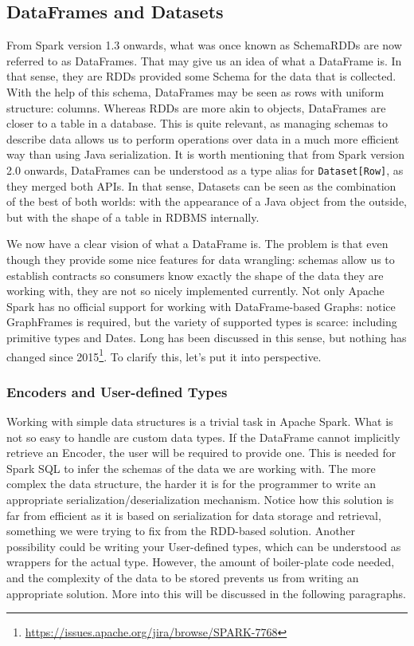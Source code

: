 \subsection{DataFrames and Datasets}

From Spark version 1.3 onwards, what was once known as SchemaRDDs are now referred to as DataFrames. That may give us an idea of what a DataFrame is. In that sense, they are RDDs provided some Schema for the data that is collected. With the help of this schema, DataFrames may be seen as rows with uniform structure: columns. Whereas RDDs are more akin to objects, DataFrames are closer to a table in a database. This is quite relevant, as managing schemas to describe data allows us to perform operations over data in a much more efficient way than using Java serialization. It is worth mentioning that from Spark version 2.0 onwards, DataFrames can be understood as a type alias for \texttt{Dataset[Row]}, as they merged both APIs. In that sense, Datasets can be seen as the combination of the best of both worlds: with the appearance of a Java object from the outside, but with the shape of a table in RDBMS internally.

We now have a clear vision of what a DataFrame is. The problem is that even though they provide some nice features for data wrangling: schemas allow us to establish contracts so consumers know exactly the shape of the data they are working with, they are not so nicely implemented currently. Not only Apache Spark has no official support for working with DataFrame-based Graphs: notice GraphFrames is required, but the variety of supported types is scarce: including primitive types and Dates. Long has been discussed in this sense, but nothing has changed since 2015\footnote{\url{https://issues.apache.org/jira/browse/SPARK-7768}}. To clarify this, let's put it into perspective.

\label{sec:encoders}
\subsubsection{Encoders and User-defined Types}

Working with simple data structures is a trivial task in Apache Spark. What is not so easy to handle are custom data types. If the DataFrame cannot implicitly retrieve an Encoder, the user will be required to provide one. This is needed for Spark SQL to infer the schemas of the data we are working with. The more complex the data structure, the harder it is for the programmer to write an appropriate serialization/deserialization mechanism. Notice how this solution is far from efficient as it is based on serialization for data storage and retrieval, something we were trying to fix from the RDD-based solution. Another possibility could be writing your  User-defined types, which can be understood as wrappers for the actual type. However, the amount of boiler-plate code needed, and the complexity of the data to be stored prevents us from writing an appropriate solution. More into this will be discussed in the following paragraphs.

